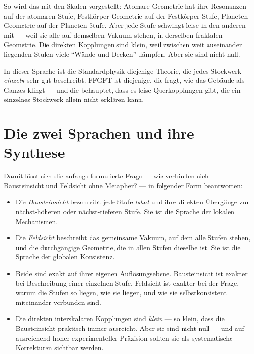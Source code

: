 So wird das mit den Skalen vorgestellt: Atomare Geometrie hat ihre
Resonanzen auf der atomaren Stufe, Festkörper-Geometrie auf der
Festkörper-Stufe, Planeten-Geometrie auf der Planeten-Stufe. Aber
jede Stufe schwingt leise in den anderen mit --- weil sie alle auf
demselben Vakuum stehen, in derselben fraktalen Geometrie. Die direkten
Kopplungen sind klein, weil zwischen weit auseinander liegenden Stufen
viele ``Wände und Decken'' dämpfen. Aber sie sind nicht null.

In dieser Sprache ist die Standardphysik diejenige Theorie, die jedes
Stockwerk \emph{einzeln} sehr gut beschreibt. FFGFT ist diejenige, die
fragt, wie das Gebäude als Ganzes klingt --- und die behauptet, dass
es leise Querkopplungen gibt, die ein einzelnes Stockwerk allein nicht
erklären kann.

\section{Die zwei Sprachen und ihre Synthese}

Damit lässt sich die anfangs formulierte Frage --- wie verbinden sich
Bausteinsicht und Feldsicht ohne Metapher? --- in folgender Form
beantworten:

\begin{itemize}\setlength\itemsep{2pt}
  \item Die \emph{Bausteinsicht} beschreibt jede Stufe \emph{lokal}
        und ihre direkten Übergänge zur nächst-höheren oder
        nächst-tieferen Stufe. Sie ist die Sprache der lokalen
        Mechanismen.
  \item Die \emph{Feldsicht} beschreibt das gemeinsame Vakuum, auf dem
        alle Stufen stehen, und die durchgängige Geometrie, die in
        allen Stufen dieselbe ist. Sie ist die Sprache der globalen
        Konsistenz.
  \item Beide sind exakt auf ihrer eigenen Auflösungsebene. Bausteinsicht
        ist exakter bei Beschreibung einer einzelnen Stufe. Feldsicht
        ist exakter bei der Frage, warum die Stufen so liegen, wie sie
        liegen, und wie sie selbstkonsistent miteinander verbunden sind.
  \item Die direkten interskalaren Kopplungen sind \emph{klein} --- so
        klein, dass die Bausteinsicht praktisch immer ausreicht. Aber
        sie sind nicht null --- und auf ausreichend hoher
        experimenteller Präzision sollten sie als systematische
        Korrekturen sichtbar werden.
\end{itemize}

